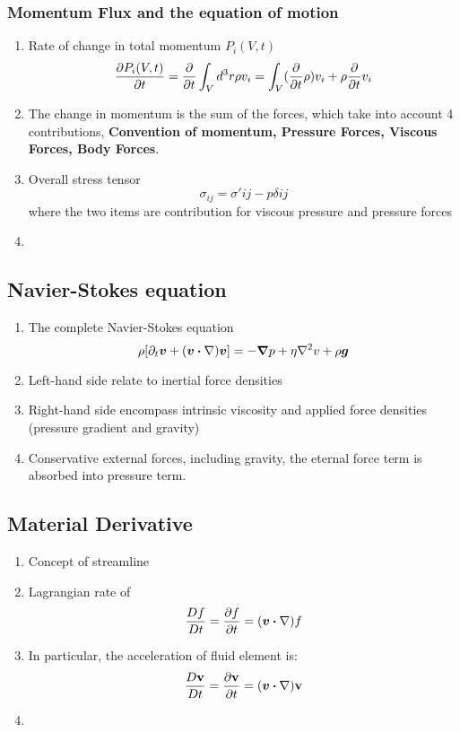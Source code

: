 \documentclass[12pt,a4paper]{article}
\begin{document}
        \subsubsection{Momentum Flux and the equation of motion}
            \begin{enumerate}
                \item Rate of change in total momentum $P_i(V,t)$
                $$
                    \pdv{P_i(V,t)}{t}=\pdv{t} \int_{V}d^3r\rho v_i=\int_{V}(\pdv{t}\rho) v_i+\rho\pdv{t}v_i
                $$
                \item The change in momentum is the sum of the forces, which take into account 4 contributions, \textbf{Convention of momentum, Pressure Forces, Viscous Forces, Body Forces}.
                \item Overall stress tensor 
                $$
                    \sigma_{ij}=\sigma' {ij} - p\delta{ij}
                $$
                where the two items are contribution for viscous pressure and pressure forces
                \item 
            \end{enumerate}
        \subsection{Navier-Stokes equation}
            \begin{enumerate}
                \item The complete Navier-Stokes equation
                $$
                    \rho [\partial_t\vb*{v} + (\vb*{v}\dotproduct \nabla)\vb*{v}]= - \grad{p} +\eta\laplacian{v}+\rho\vb*{g}
                $$
                \item Left-hand side relate to inertial force densities
                \item Right-hand side encompass intrinsic viscosity and applied force densities (pressure gradient and gravity)
                \item Conservative external forces, including gravity, the eternal force term is absorbed into pressure term.
            \end{enumerate}
        \subsection{Material Derivative}
            \begin{enumerate}
                \item Concept of streamline
                \item Lagrangian rate of 
                $$
                    \frac{Df}{Dt} = \pdv{f}{t} = (\vb*{v} \dotproduct \vb{\nabla})f
                $$
                \item In particular, the acceleration of fluid element is:
                $$
                    \frac{D\vb{v}}{Dt} = \pdv{\vb{v}}{t} = (\vb*{v} \dotproduct \vb{\nabla})\vb{v}
                $$
                \item 
            \end{enumerate}
\end{document}
